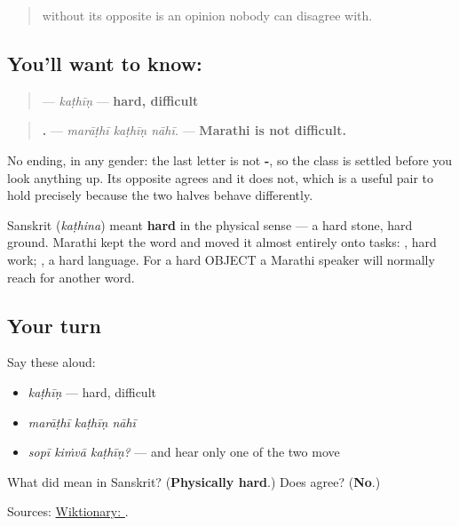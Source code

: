 \label{lesson:MR-C52-kathin}



\begin{quote}
\textbf{} without its opposite is an opinion nobody can disagree with.
\end{quote}

\subsection*{You'll want to know: }
\begin{quote}
\textbf{} — \emph{kaṭhīṇ} — \textbf{hard, difficult}
\end{quote}

\begin{quote}
\textbf{  .} — \emph{marāṭhī kaṭhīṇ nāhī.} — \textbf{Marathi is not difficult.}
\end{quote}

No ending, in any gender: the last letter is not \textbf{-}, so the class is settled before you look anything up. Its opposite \textbf{} agrees and it does not, which is a useful pair to hold precisely because the two halves behave differently.

Sanskrit \textbf{} (\emph{kaṭhina}) meant \textbf{hard} in the physical sense — a hard stone, hard ground. Marathi kept the word and moved it almost entirely onto tasks: \textbf{ }, hard work; \textbf{ }, a hard language. For a hard OBJECT a Marathi speaker will normally reach for another word.

\subsection*{Your turn}
Say these aloud:

\begin{itemize}
\raggedright
  \item \emph{kaṭhīṇ} — hard, difficult
  \item \emph{marāṭhī kaṭhīṇ nāhī}
  \item \emph{sopī kiṁvā kaṭhīṇ?} — and hear only one of the two move
\end{itemize}

\begin{tcolorbox}[breakable,colback=teal!4,colframe=teal!35!black,title={Before you move on}]
What did \textbf{} mean in Sanskrit? (\textbf{Physically hard}.) Does \textbf{} agree? (\textbf{No}.)

Sources: \href{https://en.wiktionary.org/wiki/\%E0\%A4\%95\%E0\%A4\%A0\%E0\%A5\%80\%E0\%A4\%A3}{Wiktionary: }.
\end{tcolorbox}
